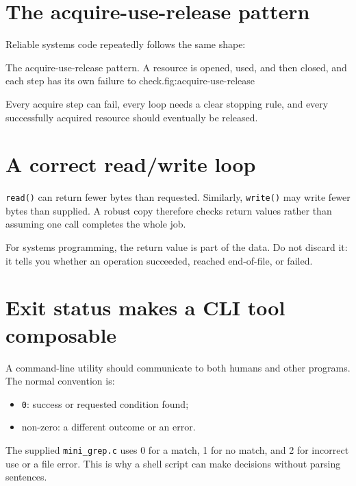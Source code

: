 \section{The acquire-use-release pattern}
Reliable systems code repeatedly follows the same shape:

\begin{utpfig}{The acquire-use-release pattern. A resource is opened, used, and then closed, and each step has its own failure to check.}{fig:acquire-use-release}
\end{utpfig}

Every acquire step can fail, every loop needs a clear stopping rule, and every successfully acquired resource should eventually be released.

\section{A correct read/write loop}
\texttt{read()} can return fewer bytes than requested. Similarly, \texttt{write()} may write fewer bytes than supplied. A robust copy therefore checks return values rather than assuming one call completes the whole job.

\begin{keyidea}
For systems programming, the return value is part of the data. Do not discard it: it tells you whether an operation succeeded, reached end-of-file, or failed.
\end{keyidea}

\section{Exit status makes a CLI tool composable}
A command-line utility should communicate to both humans and other programs. The normal convention is:
\begin{itemize}
  \item \texttt{0}: success or requested condition found;
  \item non-zero: a different outcome or an error.
\end{itemize}
The supplied \texttt{mini\_grep.c} uses 0 for a match, 1 for no match, and 2 for incorrect use or a file error. This is why a shell script can make decisions without parsing sentences.

